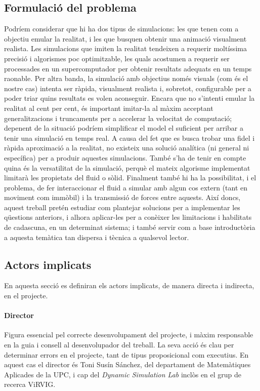 \documentclass[a4paper]{report}
\begin{document}
	\subsection{Formulació del problema}
	Podríem considerar que hi ha dos tipus de simulacions: les que tenen com a objectiu emular la realitat, i les que busquen obtenir una animació visualment realista.\newline
	Les simulacions que imiten la realitat tendeixen a requerir moltíssima precisió i algorismes poc optimitzable, les quals acostumen a requerir ser processades en un supercomputador per obtenir resultats adequats en un temps raonable. \newline
	Per altra banda, la simulació amb objectius només visuals (com és el nostre cas) intenta ser ràpida, visualment realista i, sobretot, configurable per a poder triar quins resultats es volen aconseguir. Encara que no s'intenti emular la realitat al cent per cent, és important imitar-la al màxim acceptant generalitzacions i truncaments per a accelerar la velocitat de computació; depenent de la situació podríem simplificar el model el suficient per arribar a tenir una simulació en temps real.\newline
	A causa del fet que es busca trobar una fidel i ràpida aproximació a la realitat, no existeix una solució analítica (ni general ni específica) per a produir aquestes simulacions. També s'ha de tenir en compte quina és la versatilitat de la simulació, perquè el mateix algorisme implementat limitarà les propietats del fluid o sòlid. Finalment també hi ha la possibilitat, i el problema, de fer interaccionar el fluid a simular amb algun cos extern (tant en moviment com immòbil) i la transmissió de forces entre aquests. \newline
	Així doncs, aquest treball pretén estudiar com plantejar solucions per a implementar les qüestions anteriors, i alhora aplicar-les per a conèixer les limitacions i habilitats de cadascuna, en un determinat sistema; i també servir com a base introductòria a aquesta temàtica tan dispersa i tècnica a qualsevol lector.
	
	\subsection{Actors implicats}
	En aquesta secció es definiran els actors implicats, de manera directa i indirecta, en el projecte.
	\paragraph{Director} Figura essencial pel correcte desenvolupament del projecte, i màxim responsable en la guia i consell al desenvolupador del treball. La seva acció és clau per determinar errors en el projecte, tant de tipus proposicional com executius. En aquest cas el director és Toni Susín Sánchez, del departament de Matemàtiques Aplicades de la UPC, i cap del \textit{Dynamic Simulation Lab} inclòs en el grup de recerca ViRVIG.
\end{document}
